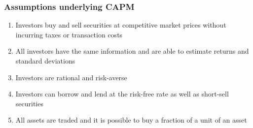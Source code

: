 \documentclass[9pt,aspectratio=169]{beamer}
\begin{document}

\begin{frame}

\frametitle{\textnormal{Assumptions underlying CAPM}}

\begin{enumerate}
    \item Investors buy and sell securities at competitive market prices without incurring taxes or transaction costs
\item All investors have the same information and are able to estimate returns and standard deviations
\item Investors are rational and risk-averse 
\item Investors can borrow and lend at the risk-free rate as well as short-sell securities
\item All assets are traded and it is possible to buy a fraction of a unit of an asset

\end{enumerate}



\end{frame}














\end{document}
